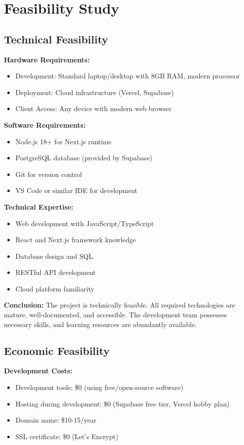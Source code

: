 \section{Feasibility Study}

\subsection{Technical Feasibility}

\textbf{Hardware Requirements:}
\begin{itemize}
\item Development: Standard laptop/desktop with 8GB RAM, modern processor
\item Deployment: Cloud infrastructure (Vercel, Supabase)
\item Client Access: Any device with modern web browser
\end{itemize}

\textbf{Software Requirements:}
\begin{itemize}
\item Node.js 18+ for Next.js runtime
\item PostgreSQL database (provided by Supabase)
\item Git for version control
\item VS Code or similar IDE for development
\end{itemize}

\textbf{Technical Expertise:}
\begin{itemize}
\item Web development with JavaScript/TypeScript
\item React and Next.js framework knowledge
\item Database design and SQL
\item RESTful API development
\item Cloud platform familiarity
\end{itemize}

\textbf{Conclusion:} The project is technically feasible. All required technologies are mature, well-documented, and accessible. The development team possesses necessary skills, and learning resources are abundantly available.

\subsection{Economic Feasibility}

\textbf{Development Costs:}
\begin{itemize}
\item Development tools: \$0 (using free/open-source software)
\item Hosting during development: \$0 (Supabase free tier, Vercel hobby plan)
\item Domain name: \$10-15/year
\item SSL certificate: \$0 (Let's Encrypt)
\end{itemize}

